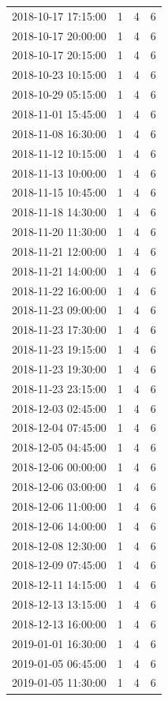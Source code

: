 \begin{tabular}{lrrr}
2018-10-17 17:15:00 & 1 & 4 & 6 \\
2018-10-17 20:00:00 & 1 & 4 & 6 \\
2018-10-17 20:15:00 & 1 & 4 & 6 \\
2018-10-23 10:15:00 & 1 & 4 & 6 \\
2018-10-29 05:15:00 & 1 & 4 & 6 \\
2018-11-01 15:45:00 & 1 & 4 & 6 \\
2018-11-08 16:30:00 & 1 & 4 & 6 \\
2018-11-12 10:15:00 & 1 & 4 & 6 \\
2018-11-13 10:00:00 & 1 & 4 & 6 \\
2018-11-15 10:45:00 & 1 & 4 & 6 \\
2018-11-18 14:30:00 & 1 & 4 & 6 \\
2018-11-20 11:30:00 & 1 & 4 & 6 \\
2018-11-21 12:00:00 & 1 & 4 & 6 \\
2018-11-21 14:00:00 & 1 & 4 & 6 \\
2018-11-22 16:00:00 & 1 & 4 & 6 \\
2018-11-23 09:00:00 & 1 & 4 & 6 \\
2018-11-23 17:30:00 & 1 & 4 & 6 \\
2018-11-23 19:15:00 & 1 & 4 & 6 \\
2018-11-23 19:30:00 & 1 & 4 & 6 \\
2018-11-23 23:15:00 & 1 & 4 & 6 \\
2018-12-03 02:45:00 & 1 & 4 & 6 \\
2018-12-04 07:45:00 & 1 & 4 & 6 \\
2018-12-05 04:45:00 & 1 & 4 & 6 \\
2018-12-06 00:00:00 & 1 & 4 & 6 \\
2018-12-06 03:00:00 & 1 & 4 & 6 \\
2018-12-06 11:00:00 & 1 & 4 & 6 \\
2018-12-06 14:00:00 & 1 & 4 & 6 \\
2018-12-08 12:30:00 & 1 & 4 & 6 \\
2018-12-09 07:45:00 & 1 & 4 & 6 \\
2018-12-11 14:15:00 & 1 & 4 & 6 \\
2018-12-13 13:15:00 & 1 & 4 & 6 \\
2018-12-13 16:00:00 & 1 & 4 & 6 \\
2019-01-01 16:30:00 & 1 & 4 & 6 \\
2019-01-05 06:45:00 & 1 & 4 & 6 \\
2019-01-05 11:30:00 & 1 & 4 & 6 \\

\end{tabular}
